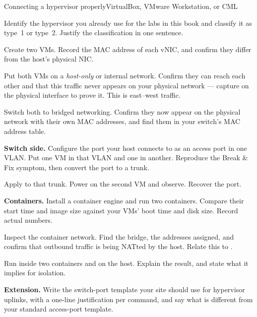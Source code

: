 \begin{lab}{Connecting a hypervisor properly}{VirtualBox, VMware Workstation, or CML}
\begin{tasks}
  \item Identify the hypervisor you already use for the labs in this book and
        classify it as type~1 or type~2. Justify the classification in one
        sentence.
  \item Create two VMs. Record the MAC address of each vNIC, and confirm they
        differ from the host's physical NIC.
  \item Put both VMs on a \emph{host-only} or internal network. Confirm they can
        reach each other and that this traffic never appears on your physical
        network --- capture on the physical interface to prove it. This is
        east--west traffic.
  \item Switch both to bridged networking. Confirm they now appear on the
        physical network with their own MAC addresses, and find them in your
        switch's MAC address table.
  \item \textbf{Switch side.} Configure the port your host connects to as an
        access port in one VLAN. Put one VM in that VLAN and one in another.
        Reproduce the Break \& Fix symptom, then convert the port to a trunk.
  \item Apply  to that trunk. Power on
        the second VM and observe. Recover the port.
  \item \textbf{Containers.} Install a container engine and run two containers.
        Compare their start time and image size against your VMs' boot time and
        disk size. Record actual numbers.
  \item Inspect the container network. Find the bridge, the addresses assigned,
        and confirm that outbound traffic is being NATted by the host. Relate
        this to .
  \item Run  inside two containers and on the host. Explain the
        result, and state what it implies for isolation.
  \item \textbf{Extension.} Write the switch-port template your site should use
        for hypervisor uplinks, with a one-line justification per command, and
        say what is different from your standard access-port template.
\end{tasks}
\end{lab}

